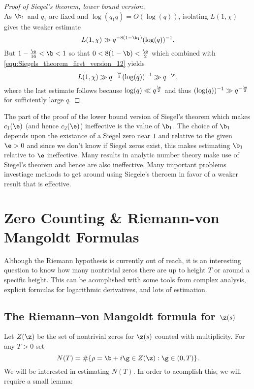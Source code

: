 \begin{proof}[Proof of Siegel's theorem, lower bound version]
\[        \]
        As $\b_{1}$ and $q_{1}$ are fixed and $\log(q_{1}q) = O(\log(q))$, isolating $L(1,\chi)$ gives the weaker estimate
        \begin{equation}\label{equ:Siegels_theorem_first_version_12}
          L(1,\chi) \gg q^{-8(1-\b_{1})}(\log(q))^{-1}.
        \end{equation}
        But $1-\frac{\e}{16} < \b < 1$ so that $0 < 8(1-\b) < \frac{\e}{2}$ which combined with \cref{equ:Siegels_theorem_first_version_12} yields
        \[
          L(1,\chi) \gg q^{-\frac{\e}{2}}(\log(q))^{-1} \gg q^{-\e},
        \]
        where the last estimate follows because $\log(q) \ll q^{\frac{\e}{2}}$ and thus $(\log(q))^{-1} \gg q^{-\frac{\e}{2}}$ for sufficiently large $q$.
      \end{proof}

      The part of the proof of the lower bound version of Siegel's theorem which makes $c_{1}(\e)$ (and hence $c_{2}(\e)$) ineffective is the value of $\b_{1}$. The choice of $\b_{1}$ depends upon the existance of a Siegel zero near $1$ and relative to the given $\e > 0$ and since we don't know if Siegel zeros exist, this makes estimating $\b_{1}$ relative to $\e$ ineffective. Many results in analytic number theory make use of Siegel's theorem and hence are also ineffective. Many important problems investiage methods to get around using Siegele's theroem in favor of a weaker result that is effective.
  \section{Zero Counting \& Riemann-von Mangoldt Formulas}
    Although the Riemann hypothesis is currently out of reach, it is an interesting question to know how many nontrivial zeros there are up to height $T$ or around a specific height. This can be acomplished with some tools from complex analysis, explicit formulas for logarithmic derivatives, and lots of estimation.
    \subsection*{The Riemann–von Mangoldt formula for $\z(s)$}
      Let $Z(\z)$ be the set of nontrivial zeros for $\z(s)$ counted with multiplicity. For any $T > 0$ set
      \[
        N(T) = \#\{\rho = \b+i\g \in Z(\z): \g \in (0,T)\}.
      \]
      We will be interested in estimating $N(T)$. In order to acomplish this, we will require a small lemma:

